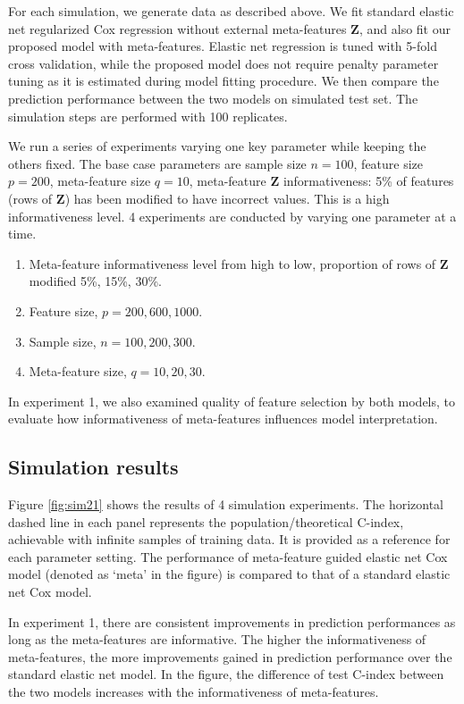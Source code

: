 For each simulation, we generate data as described above. We fit standard elastic net regularized Cox regression without external meta-features $\bm{Z}$, and also fit our proposed model with meta-features. Elastic net regression is tuned with 5-fold cross validation, while the proposed model does not require penalty parameter tuning as it is estimated during model fitting procedure. We then compare the prediction performance between the two models on simulated test set. The simulation steps are performed with 100 replicates. 

We run a series of experiments varying one key parameter while keeping the others fixed. The base case parameters are sample size $n=100$, feature size $p=200$, meta-feature size $q=10$, meta-feature $\bm{Z}$ informativeness: 5\% of features (rows of $\bm{Z}$) has been modified to have incorrect values. This is a high informativeness level. 4 experiments are conducted by varying one parameter at a time.
\begin{enumerate}
    \item Meta-feature informativeness level from high to low, proportion of rows of $\bm{Z}$ modified 5\%, 15\%, 30\%.
    \item Feature size, $p=200, 600, 1000$.
    \item Sample size, $n=100, 200, 300$.
    \item Meta-feature size, $q=10, 20, 30$.
\end{enumerate}
In experiment 1, we also examined quality of feature selection by both models, to evaluate how informativeness of meta-features influences model interpretation.

\subsection{Simulation results}
Figure \ref{fig:sim21} shows the results of 4 simulation experiments. The horizontal dashed line in each panel represents the population/theoretical C-index, achievable with infinite samples of training data. It is provided as a reference for each parameter setting. The performance of meta-feature guided elastic net Cox model (denoted as `meta' in the figure) is compared to that of a standard elastic net Cox model. 

In experiment 1, there are consistent improvements in prediction performances as long as the meta-features are informative. The higher the informativeness of meta-features, the more improvements gained in prediction performance over the standard elastic net model. In the figure, the difference of test C-index between the two models increases with the informativeness of meta-features. 

